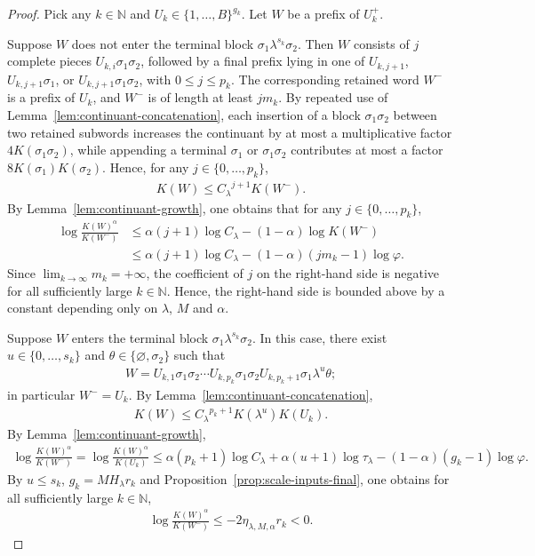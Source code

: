 \documentclass[12pt,reqno]{amsart}
\theoremstyle{definition}
\theoremstyle{plain}
\begin{document}
\begin{proof}
Pick any $k\in\mathbb{N}$ and $U_k\in\{1,\ldots,B\}^{g_k}$. Let $W$ be a prefix of $U^+_k$.

Suppose $W$ does not enter the terminal block $\sigma_1\lambda^{s_k}\sigma_2$. Then $W$ consists of $j$ complete pieces $U_{k,i}\sigma_1\sigma_2$, followed by a final prefix lying in one of $U_{k,j+1}$, $U_{k,j+1}\sigma_1$, or $U_{k,j+1}\sigma_1\sigma_2$, with $0\leq j\leq p_k$. The corresponding retained word $W^-$ is a prefix of $U_k$, and $W^-$ is of length at least $jm_k$. By repeated use of Lemma~\ref{lem:continuant-concatenation}, each insertion of a block $\sigma_1\sigma_2$ between two retained subwords increases the continuant by at most a multiplicative factor $4K(\sigma_1\sigma_2)$, while appending a
terminal $\sigma_1$ or $\sigma_1\sigma_2$ contributes at most a factor $8K(\sigma_1)K(\sigma_2)$. Hence, for any $j\in\{0,\ldots,p_k\}$,
\begin{align*}
    K(W)\leq {C_\lambda}^{j+1}K(W^-).
\end{align*}
By Lemma~\ref{lem:continuant-growth}, one obtains that for any $j\in\{0,\ldots,p_k\}$,
\begin{align*}
    \log\frac{K(W)^\alpha}{K(W^-)}
    &\leq
    \alpha(j+1)\log C_\lambda
    -(1-\alpha)\log K(W^-) \\
    &\leq
    \alpha(j+1)\log C_\lambda-(1-\alpha)(j m_k-1)\log\varphi.
\end{align*}
Since $\lim_{k\to\infty}m_k=+\infty$, the coefficient of $j$ on the right-hand side is negative for all sufficiently large $k\in\mathbb{N}$. Hence, the right-hand side is bounded above by a constant depending only on $\lambda$, $M$ and $\alpha$.

Suppose $W$ enters the terminal block $\sigma_1\lambda^{s_k}\sigma_2$. In this case, there exist $u\in\{0,\ldots,s_k\}$ and $\theta\in\{\varnothing,\sigma_2\}$ such that
\begin{align*}
    W=
    U_{k,1}\sigma_1\sigma_2\cdots U_{k,p_k}\sigma_1\sigma_2U_{k,p_k+1}\sigma_1\lambda^{u}\theta;
\end{align*}
in particular $W^-=U_k$. By Lemma~\ref{lem:continuant-concatenation},
\begin{align*}
    K(W)\leq {C_\lambda}^{p_k+1}K(\lambda^u)K(U_k).
\end{align*}
By Lemma~\ref{lem:continuant-growth},
\begin{align*}
    \log\frac{K(W)^\alpha}{K(W^-)}
    =
    \log\frac{K(W)^\alpha}{K(U_k)}
    \leq
    \alpha(p_k+1)\log C_\lambda+\alpha(u+1)\log\tau_\lambda-(1-\alpha)(g_k-1)\log\varphi.
\end{align*}
By $u\leq s_k$, $g_k=MH_\lambda r_k$ and Proposition~\ref{prop:scale-inputs-final}, one obtains for all sufficiently large $k\in\mathbb{N}$, 
\begin{align*}
    \log\frac{K(W)^\alpha}{K(W^-)}
    \leq -2\eta_{\lambda,M,\alpha} r_k<0.
\end{align*}
\end{proof}
\end{document}
